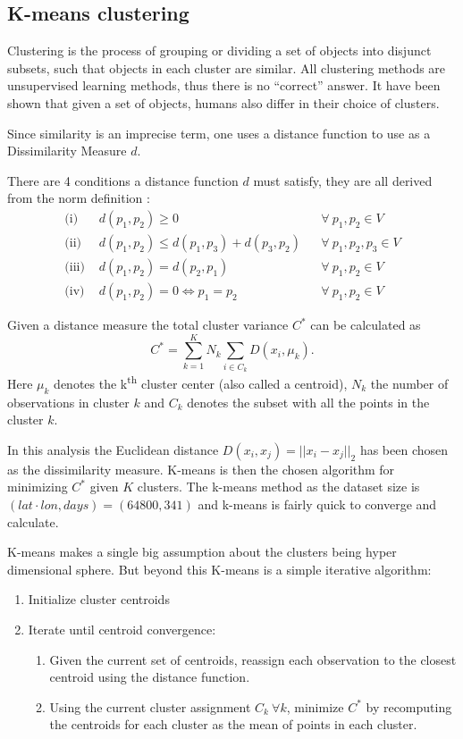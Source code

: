 \subsection{K-means clustering}

Clustering is the process of grouping or dividing a set of objects into disjunct subsets, such that objects in each cluster are similar.
All clustering methods are unsupervised learning methods, thus there is no ``correct'' answer.
It have been shown that given a set of objects, humans also differ in their choice of clusters.

Since similarity is an imprecise term, one uses a distance function to use as a Dissimilarity Measure $d$.

There are 4 conditions a distance function $d$ must satisfy, they are all derived from the norm definition \cite[p.~30]{math-4}:
\begin{align}
\text{(i) }   & d(p_1,p_2) \ge 0 && \forall \ p_1, p_2 \in V \\
\text{(ii) }  & d(p_1,p_2) \le d(p_1, p_3) + d(p_3, p_2) && \forall \ p_1, p_2, p_3 \in V \\
\text{(iii) } & d(p_1, p_2) = d(p_2, p_1) && \forall \ p_1, p_2 \in V \\
\text{(iv) } & d(p_1, p_2) = 0 \Leftrightarrow p_1 = p_2 && \forall \ p_1, p_2 \in V
\end{align}

Given a distance measure the total cluster variance $C^{*}$ can be calculated as
\begin{equation}
C^{*}=\sum^K_{k=1} N_k \sum_{i \in C_k} D(x_i, \mu_k).
\end{equation}
Here $\mu_k$ denotes the k\textsuperscript{th} cluster center (also called a centroid), $N_k$ the number of observations in cluster $k$ and $C_k$ denotes the subset with all the points in the cluster $k$.

In this analysis the Euclidean distance $D(x_i, x_j) = ||x_i - x_j||_2$ has been chosen as the dissimilarity measure.
K-means is then the chosen algorithm for minimizing $C^{*}$ given $K$ clusters.
The k-means method as the dataset size is $(lat \cdot lon, days) = (64800,341)$ and k-means is fairly quick to converge and calculate.

K-means makes a single big assumption about the clusters being hyper dimensional sphere. But beyond this K-means is a simple iterative algorithm:
\begin{enumerate}
	\item Initialize cluster centroids
	\item Iterate until centroid convergence:
	\begin{enumerate}
		\item Given the current set of centroids, reassign each observation to the closest centroid using the distance function.
		\item Using the current cluster assignment $C_k\ \forall k$, minimize $C^{*}$ by recomputing the centroids for each cluster as the mean of points in each cluster.
	\end{enumerate}
\end{enumerate}

